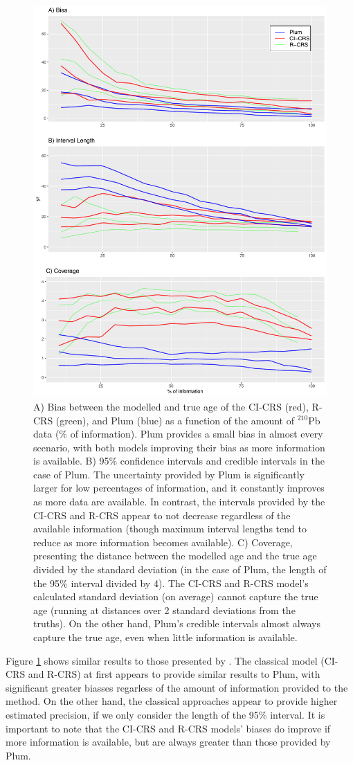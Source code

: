\documentclass [10pt] {article}
\begin{document}
\begin{figure}[!]
 \centering
  \includegraphics[width=.65\linewidth]{AccPrec.pdf}
	\caption{ A) Bias between the modelled and true age of the CI-CRS (red), R-CRS (green), and Plum (blue) as a function of the amount of $^{210}$Pb data (\% of information). Plum provides a small bias in almost every scenario, with both models improving their bias as more information is available. B) 95\% confidence intervals and credible intervals in the case of Plum. The uncertainty provided by Plum is significantly larger for low percentages of information, and it constantly improves as more data are available. In contrast, the intervals provided by the CI-CRS and R-CRS appear to not decrease regardless of the available information (though maximum interval lengths tend to reduce as more information becomes available). C) Coverage, presenting the distance between the modelled age and the true age divided by the standard deviation (in the case of Plum, the length of the 95\% interval divided by 4). The CI-CRS and R-CRS model's calculated standard deviation (on average) cannot capture the true age (running at distances over 2 standard deviations from the truths). On the other hand, Plum's credible intervals almost always capture the true age, even when little information is available.}
  \label{fig:accpre}
\end{figure}


Figure \ref{fig:accpre} shows similar results to those presented by \citet{Blaauw2018}. 
The classical model (CI-CRS and R-CRS) at first appears to provide similar results to Plum, with significant greater biasses regarless of the amount of information provided to the method. On the other hand, the classical approaches appear to provide higher estimated precision, if we only consider the length of the 95\% interval. 
It is important to note that the CI-CRS and R-CRS models' biases do improve if more information is available, but are always greater than those provided by Plum. 
\end{document}
